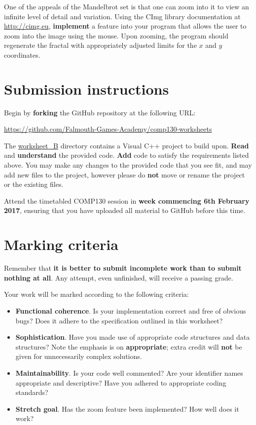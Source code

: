 \documentclass{../../fal_assignment}
\begin{document}
One of the appeals of the Mandelbrot set is that one can zoom into it to view an infinite level of detail and variation.
Using the CImg library documentation at \url{http://cimg.eu}, \textbf{implement} a feature into your program
that allows the user to zoom into the image using the mouse.
Upon zooming, the program should regenerate the fractal with appropriately adjusted limits for the
$x$ and $y$ coordinates. 

\section*{Submission instructions}

Begin by \textbf{forking} the GitHub repository at the following URL:

\url{https://github.com/Falmouth-Games-Academy/comp130-worksheets}

The \url{worksheet_B} directory contains a Visual C++ project to build upon.
\textbf{Read} and \textbf{understand} the provided code.
\textbf{Add} code to satisfy the requirements listed above.
You may make any changes to the provided code that you see fit,
and may add new files to the project,
however please do \textbf{not} move or rename the project or the existing files.

Attend the timetabled COMP130 session in \textbf{week commencing 6th February 2017},
ensuring that you have uploaded all material to GitHub before this time.

\section*{Marking criteria}

Remember that \textbf{it is better to submit incomplete work than to submit nothing at all}.
Any attempt, even unfinished, will receive a passing grade.

Your work will be marked according to the following criteria:
\begin{itemize}
	\item \textbf{Functional coherence}. Is your implementation correct and free of obvious bugs?
		Does it adhere to the specification outlined in this worksheet?
	\item \textbf{Sophistication}. Have you made use of appropriate code structures and data structures?
		Note the emphasis is on \textbf{appropriate}; extra credit will \textbf{not} be given for unnecessarily complex solutions.
	\item \textbf{Maintainability}. Is your code well commented? Are your identifier names appropriate and descriptive?
		Have you adhered to appropriate coding standards?
	\item \textbf{Stretch goal}. Has the zoom feature been implemented? How well does it work?
\end{itemize}
\end{document}
